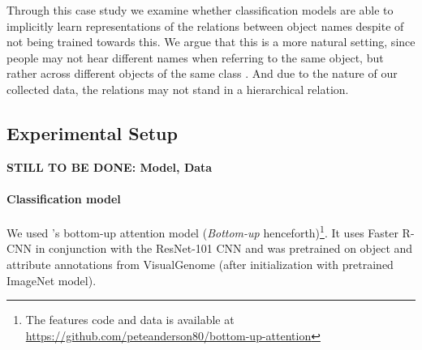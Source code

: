 Through this case study we examine whether classification models are able to implicitly learn representations of the relations between object names despite of not being trained towards this. 
We argue that this is a more natural setting, since people may not hear different names when referring to the same object, but rather across different objects of the same class . 
And due to the nature of our collected data, the relations may not stand in a hierarchical relation. 



\subsection{Experimental Setup}
\textbf{STILL TO BE DONE: Model, Data}
\paragraph{Classification model}
We used \citeauthor{anderson2018updown}'s \citeyear{anderson2018updown} bottom-up attention model (\textit{Bottom-up} henceforth)\footnote{The features code and data is available at \url{https://github.com/peteanderson80/bottom-up-attention}}. 
It uses Faster R-CNN in conjunction with the ResNet-101 CNN and was pretrained on object and attribute annotations from VisualGenome (after initialization with pretrained ImageNet model).
\iffalse
"To pretrain the bottom-up attention model, we first initialize Faster R-CNN with ResNet-101 pretrained for classification on ImageNet [35]. We then train on Visual
Genome [21] data. To aid the learning of good feature
representations, we add an additional training output for
predicting attribute classes (in addition to object classes).
To predict attributes for region i, we concatenate the mean
pooled convolutional feature vi with a learned embedding
of the ground-truth object class, and feed this into an additional output layer defining a softmax distribution over each
attribute class plus a ‘no attributes’ class.
The original Faster R-CNN multi-task loss function contains four components, defined over the classification and
bounding box regression outputs for both the RPN and the
final object class proposals respectively. We retain these
components and add an additional multi-class loss component to train the attribute predictor"
\fi

